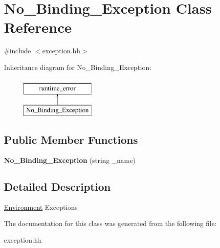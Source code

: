 \hypertarget{classNo__Binding__Exception}{\section{No\-\_\-\-Binding\-\_\-\-Exception Class Reference}
\label{classNo__Binding__Exception}
}


{\ttfamily \#include $<$exception.\-hh$>$}

Inheritance diagram for No\-\_\-\-Binding\-\_\-\-Exception\-:\begin{figure}[H]
\begin{center}
\leavevmode
\includegraphics[height=2.000000cm]{classNo__Binding__Exception}
\end{center}
\end{figure}
\subsection*{Public Member Functions}
\begin{DoxyCompactItemize}
\item 
\hypertarget{classNo__Binding__Exception_a83b63c7e8934d48a3a9476b75552e010}{{\bfseries No\-\_\-\-Binding\-\_\-\-Exception} (string \-\_\-name)}\label{classNo__Binding__Exception_a83b63c7e8934d48a3a9476b75552e010}

\end{DoxyCompactItemize}


\subsection{Detailed Description}
\hyperlink{classEnvironment}{Environment} Exceptions 

The documentation for this class was generated from the following file\-:\begin{DoxyCompactItemize}
\item 
exception.\-hh\end{DoxyCompactItemize}
